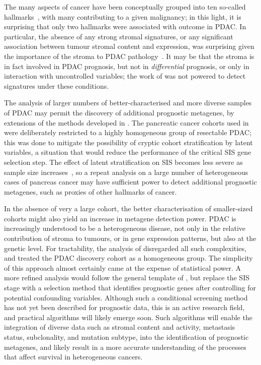 \documentclass[thesis.tex]{subfiles}
\begin{document}
The many aspects of cancer have been conceptually grouped into ten so-called hallmarks~\cite{Hanahan2011}, with many contributing to a given malignancy; in this light, it is surprising that only two hallmarks were associated with outcome in \gls{PDAC}.  In particular, the absence of any strong stromal signatures, or any significant association between tumour stromal content and expression, was surprising given the importance of the stroma to \gls{PDAC} pathology~\cite{Luo2012}.  It may be that the stroma is in fact involved in \gls{PDAC} prognosis, but not in \emph{differential} prognosis, or only in interaction with uncontrolled variables; the work of  was not powered to detect signatures under these conditions.

The analysis of larger numbers of better-characterised and more diverse samples of \gls{PDAC} may permit the discovery of additional prognostic metagenes, by extensions of the methods developed in .  The pancreatic cancer cohorts used in  were deliberately restricted to a highly homogeneous group of resectable \gls{PDAC}; this was done to mitigate the possibility of cryptic cohort stratification by latent variables, a situation that would reduce the performance of the critical \gls{SIS} gene selection step.  The effect of latent stratification on \gls{SIS} becomes less severe as sample size increases~\cite{Gorst-Rasmussen2013}, so a repeat  analysis on a large number of heterogeneous cases of pancreas cancer may have sufficient power to detect additional prognostic metagenes, such as proxies of other hallmarks of cancer.

In the absence of very a large cohort, the better characterisation of smaller-sized cohorts might also yield an increase in metagene detection power.  \gls{PDAC} is increasingly understood to be a heterogeneous disease, not only in the relative contribution of stroma to tumours, or in gene expression patterns, but also at the genetic level.  For tractability, the analysis of  disregarded all such complexities, and treated the \gls{PDAC} discovery cohort as a homogeneous group.  The simplicity of this approach almost certainly came at the expense of statistical power.  A more refined analysis would follow the general template of , but replace the \gls{SIS} stage with a selection method that identifies prognostic genes after controlling for potential confounding variables.  Although such a conditional screening method has not yet been described for prognostic data, this is an active research field, and practical algorithms will likely emerge soon.  Such algorithms will enable the integration of diverse data such as stromal content and activity, metastasis status, subclonality, and mutation subtype, into the identification of prognostic metagenes, and likely result in a more accurate understanding of the processes that affect survival in heterogeneous cancers.
\end{document}

